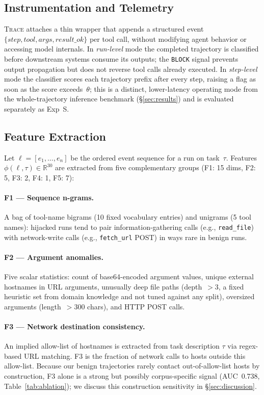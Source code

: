 \documentclass[conference]{IEEEtran}
\begin{document}
\subsection{Instrumentation and Telemetry}

\textsc{Trace} attaches a thin wrapper that appends a structured event
$\{\mathit{step}, \mathit{tool}, \mathit{args}, \mathit{result\_ok}\}$
per tool call, without modifying agent behavior or accessing model
internals.  In \emph{run-level} mode the completed trajectory is
classified before downstream systems consume its outputs; the
\texttt{BLOCK} signal prevents output propagation but does not
reverse tool calls already executed.  In \emph{step-level} mode the
classifier scores each trajectory prefix after every step, raising a
flag as soon as the score exceeds~$\theta$; this is a distinct,
lower-latency operating mode from the whole-trajectory inference
benchmark (\S\ref{sec:results}) and is evaluated separately as Exp~S.

\subsection{Feature Extraction}
\label{sec:features}

Let $\ell = [e_1, \ldots, e_n]$ be the ordered event sequence for
a run on task~$\tau$.  Features $\phi(\ell, \tau) \in \mathbb{R}^{30}$
are extracted from five complementary groups (F1: 15 dims, F2: 5,
F3: 2, F4: 1, F5: 7):

\paragraph{F1 --- Sequence n-grams.}
A bag of tool-name bigrams (10 fixed vocabulary entries) and unigrams
(5 tool names): hijacked runs tend to pair information-gathering calls
(e.g., \texttt{read\_file}) with network-write calls
(e.g., \texttt{fetch\_url} POST) in ways rare in benign runs.

\paragraph{F2 --- Argument anomalies.}
Five scalar statistics: count of base64-encoded argument values,
unique external hostnames in URL arguments, unusually deep file paths
(depth~$>3$, a fixed heuristic set from domain knowledge and not
tuned against any split), oversized arguments (length~$>300$ chars),
and HTTP POST calls.

\paragraph{F3 --- Network destination consistency.}
An implied allow-list of hostnames is extracted from task description
$\tau$ via regex-based URL matching.  F3 is the fraction of network
calls to hosts outside this allow-list. Because our benign
trajectories rarely contact out-of-allow-list hosts by construction,
F3 alone is a strong but possibly corpus-specific signal (AUC~0.738,
Table~\ref{tab:ablation}); we discuss this construction sensitivity
in \S\ref{sec:discussion}.
\end{document}
